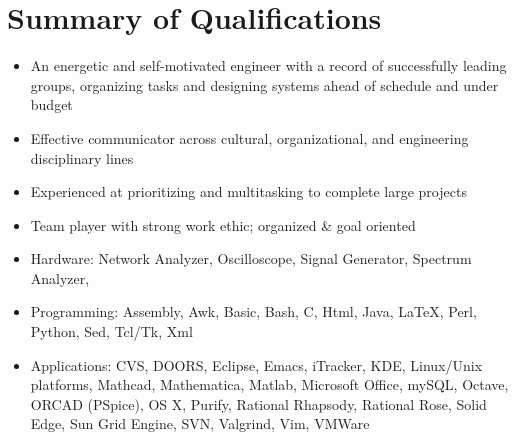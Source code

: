 \documentclass[8pt]{article}
\newenvironment{outerlist}[1][\enskip\textbullet]%
       {\begin{compactenum}[#1]}{\end{compactenum}%
        \vspace{-.3\baselineskip}}
\newenvironment{innerlist}[1][\enskip\textbullet]%
       {\begin{compactenum}[#1]}{\end{compactenum}}
\newcommand{\blankline}{\quad\pagebreak[2]}
\def\CC{{C\nolinebreak[4]\hspace{-.05em}\raisebox{.4ex}{\tiny\bf ++}}}
\begin{document}
\section{\textbf{Summary of Qualifications}}
\begin{itemize}
{\small
\item[] %
\begin{itemize}
\item An energetic and self-motivated engineer with a record of successfully leading groups,
     organizing tasks and designing systems ahead of schedule and under budget

\item Effective communicator across cultural, organizational, and engineering disciplinary lines

\item Experienced at prioritizing and multitasking to complete large projects

\item Team player with strong work ethic; organized \& goal oriented
\end{itemize}


%
\begin{itemize}
\item Hardware: Network Analyzer, Oscilloscope, Signal Generator, Spectrum Analyzer, %


\item Programming: Assembly,
					Awk,
					Basic,
					Bash,
					\CC,
					Html,
	     			Java,
					\LaTeX{},
					Perl,
					Python,
					Sed,
					Tcl/Tk,
					Xml


\item Applications: CVS,
					DOORS,
					Eclipse,
					Emacs,
					iTracker,
					KDE,
					Linux/Unix platforms,
					Mathcad,
					Mathematica,
					Matlab,
					Microsoft Office,
					mySQL,
					Octave,
					ORCAD (PSpice),
					OS X,
					Purify,
					Rational Rhapsody,
					Rational Rose,
					Solid Edge,
					Sun Grid Engine,
					SVN,
					Valgrind,
					Vim,
					VMWare




\end{itemize}
}
\end{itemize}
\end{document}
